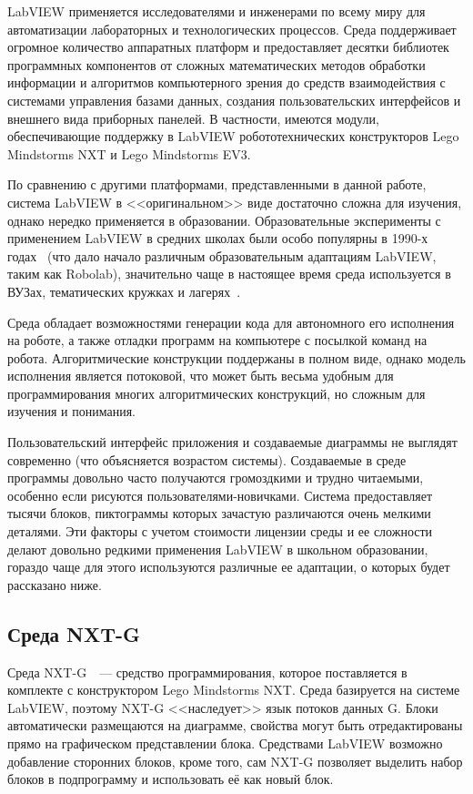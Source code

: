 \documentclass[a5paper]{article}
\begin{document}
LabVIEW применяется исследователями и инженерами по всему миру для автоматизации лабораторных и технологических 
процессов. Среда поддерживает огромное количество аппаратных платформ и предоставляет десятки библиотек 
программных компонентов от сложных математических методов обработки информации и алгоритмов компьютерного 
зрения до средств взаимодействия с системами управления базами данных, создания пользовательских интерфейсов 
и внешнего вида приборных панелей. В частности, имеются модули, обеспечивающие поддержку в LabVIEW 
робототехнических конструкторов Lego Mindstorms NXT и Lego Mindstorms EV3.

По сравнению с другими платформами, представленными в данной работе, система LabVIEW в <<оригинальном>> виде 
достаточно сложна для изучения, однако нередко применяется в образовании. Образовательные эксперименты с 
применением LabVIEW в средних школах были особо популярны в 1990-х годах~\cite{cyr1997low} (что дало начало различным 
образовательным адаптациям LabVIEW, таким как Robolab), значительно чаще в настоящее время среда используется 
в ВУЗах, тематических кружках и лагерях~\cite{stefanovic2011labview}.

Среда обладает возможностями генерации кода для автономного его исполнения на роботе, а также отладки программ 
на компьютере с посылкой команд на робота. Алгоритмические конструкции поддержаны в полном виде, однако модель 
исполнения является потоковой, что может быть весьма удобным для программирования многих алгоритмических 
конструкций, но сложным для изучения и понимания.

Пользовательский интерфейс приложения и создаваемые диаграммы не выглядят современно (что объясняется возрастом 
системы). Создаваемые в среде программы довольно часто получаются громоздкими и трудно читаемыми, особенно 
если рисуются пользователями-новичками. Система предоставляет тысячи блоков, пиктограммы которых зачастую 
различаются очень мелкими деталями. Эти факторы с учетом стоимости лицензии среды и ее сложности делают 
довольно редкими применения LabVIEW в школьном образовании, гораздо чаще для этого используются различные 
ее адаптации, о которых будет рассказано ниже.

\subsection{Среда NXT-G}

Среда NXT-G~\cite{kelly2010lego}~--- средство программирования, которое поставляется в комплекте 
с конструктором Lego Mindstorms NXT. Среда базируется на системе LabVIEW, поэтому 
NXT-G <<наследует>> язык потоков данных G. Блоки автоматически 
размещаются на диаграмме, свойства могут быть отредактированы прямо на графическом представлении блока. 
Средствами LabVIEW возможно добавление сторонних блоков, кроме того, сам NXT-G позволяет выделить набор 
блоков в подпрограмму и использовать её как новый блок.
\end{document}
